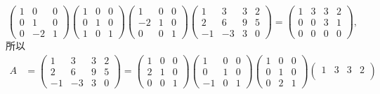 ﻿\documentclass{book} \usepackage{exsheets} \usepackage{xeCJK}
\begin{document}
\begin{solution}
$$
\begin{pmatrix}
  1&0&0\\
  0&1&0\\
  0&-2&1
\end{pmatrix}
\begin{pmatrix}
  1&0&0\\
  0&1&0\\
  1&0&1
\end{pmatrix}
\begin{pmatrix}
  1&0&0\\
  -2&1&0\\
  0&0&1
\end{pmatrix}
\begin{pmatrix}
  1&3&3&2\\
  2&6&9&5\\
  -1&-3&3&0
\end{pmatrix}=
\begin{pmatrix}
  1&3&3&2\\
  0&0&3&1\\
  0&0&0&0
\end{pmatrix},
$$
所以
\begin{align*}
  A&=
     \begin{pmatrix}
       1&3&3&2\\
       2&6&9&5\\
       -1&-3&3&0
     \end{pmatrix}=
                \begin{pmatrix}
                  1&0&0\\
                  2&1&0\\
                  0&0&1
                \end{pmatrix}
                       \begin{pmatrix}
                         1&0&0\\
                         0&1&0\\
                         -1&0&1
                       \end{pmatrix}
                               \begin{pmatrix}
                                 1&0&0\\
                                 0&1&0\\
                                 0&2&1
                               \end{pmatrix}
                                      \begin{pmatrix}
                                        1&3&3&2\\

\end{pmatrix}
\end{align*}
\end{solution}
\end{document}
